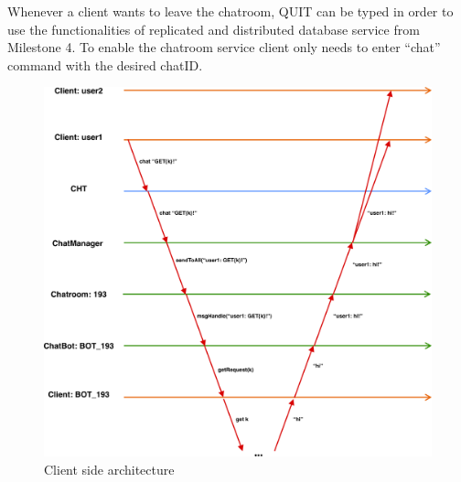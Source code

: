 Whenever a client wants to leave the chatroom, QUIT can be typed in order to use the functionalities of replicated and distributed database service from Milestone 4. To enable the chatroom service client only needs to enter “chat” command with the desired chatID. 

\begin{figure}[h]
	\centering
	\includegraphics[width=\linewidth]{figures/chat_graph.png}
	\caption{Client side architecture}
\end{figure}



